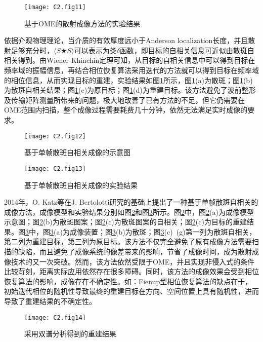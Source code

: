 \begin{figure}[htp]
	\centering
	\texttt{[image: C2.fig11]}
	\caption{基于OME的散射成像方法的实验结果}
	\label{fig2:11}
\end{figure}

依据介观物理理论\cite{akkermans_mesoscopic_2007,goodman_speckle_2007}，当介质的有效厚度远小于Anderson localization长度，并且散射足够充分时，$\langle S\bigstar S \rangle$可以表示为类$\delta$函数\cite{bertolotti_non-invasive_2012}，即目标的自相关信息可近似由散斑自相关得到。由Wiener-Khinchin定理可知，从目标的自相关信息中可以得到目标在频率域的振幅信息，再结合相位恢复算法采用迭代的方法就可以得到目标在频率域的相位信息，从而实现目标的重建，实验结果如图\ref{fig2:11}所示\cite{bertolotti_non-invasive_2012}，图\ref{fig2:11}(a)为散斑；图\ref{fig2:11}(b)为散斑自相关结果；图\ref{fig2:11}(c)为原目标；图\ref{fig2:11}(d)为重建目标。该方法避免了波前整形及传输矩阵测量所带来的问题，极大地改善了已有方法的不足，但它仍需要在OME范围内扫描，整个成像过程需要耗费几十分钟，依然无法满足实时成像的要求。


\begin{figure}[htp]
	\centering
	\texttt{[image: C2.fig12]}
	\caption{基于单帧散斑自相关成像的示意图}
	\label{fig2:12}
\end{figure}
\begin{figure}[htp]
	\centering
	\texttt{[image: C2.fig13]}
	\caption{基于单帧散斑自相关成像的实验结果}
	\label{fig2:13}
\end{figure}
2014年，O. Katz等\cite{katz_non-invasive_2014}在J. Bertolotti研究的基础上提出了一种基于单帧散斑自相关的成像方法，成像模型和实验结果分别如图\ref{fig2:12}和图\ref{fig2:13}所示\cite{katz_non-invasive_2014}。图\ref{fig2:12}中，图\ref{fig2:12}(a)为成像模型示意图；图\ref{fig2:12}(b)为散斑图案；图\ref{fig2:12}(c)为散斑图案的自相关；图\ref{fig2:12}(c)为目标的重建结果。图\ref{fig2:13}中，图\ref{fig2:13}(a)为成像装置；图\ref{fig2:13}(b)为散斑；图\ref{fig2:13}(c)~(g)第一列为散斑自相关，第二列为重建目标，第三列为原目标。该方法不仅完全避免了原有成像方法需要扫描的缺陷，而且避免了成像系统的像差带来的影响，节省了成像时间，成为散射成像技术的又一次突破。然而，该方法依然受限于OME，并且实现非侵入式的条件比较苛刻，距离实际应用依然存在很多障碍。同时，该方法的成像效果会受到相位恢复算法的影响，成像存在不确定性。如：Fienup型相位恢复算法\cite{fienup_phase_1982,fienup_reconstruction_1978}的缺点在于，初始迭代相位的随机性导致最终的重建目标在方向、空间位置上具有随机性，进而导致了重建结果的不确定性。

\begin{figure}[htp]
	\centering
	\texttt{[image: C2.fig14]}
	\caption{采用双谱分析得到的重建结果}
	\label{fig2:14}
\end{figure}

